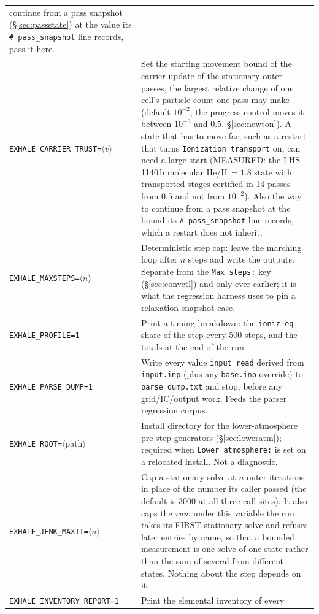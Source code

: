 \documentclass[english,a4paper]{my_memo}
\begin{document}
{\begin{longtable}{@{}lp{10.2cm}@{}}
  continue from a pass snapshot (\S\ref{sec:passstate}) at the value its
  \texttt{\# pass\_snapshot} line records, pass it here. \\
\texttt{EXHALE\_CARRIER\_TRUST=}$\langle v\rangle$ & Set the starting
  movement bound of the carrier update of the stationary outer passes, the
  largest relative change of one cell's particle count one pass may make
  (default $10^{-2}$; the progress control moves it between $10^{-3}$ and
  $0.5$, \S\ref{sec:newton}). A state that has to move far, such as a
  restart that turns \texttt{Ionization transport} on, can need a large start
  (MEASURED: the LHS\,1140\,b molecular He/H\,$=1.8$ state with transported
  stages certified in 14 passes from $0.5$ and not from $10^{-2}$). Also the
  way to continue from a pass snapshot at the bound its
  \texttt{\# pass\_snapshot} line records, which a restart does not inherit. \\
\midrule
\texttt{EXHALE\_MAXSTEPS=}$\langle n\rangle$ & Deterministic step cap: leave
  the marching loop after $n$ steps and write the outputs. Separate from the
  \texttt{Max steps:} key (\S\ref{sec:convctl}) and only ever earlier; it is
  what the regression harness uses to pin a relaxation-snapshot case. \\
\texttt{EXHALE\_PROFILE=1} & Print a timing breakdown: the
  \texttt{ioniz\_eq} share of the step every 500 steps, and the totals at the
  end of the run. \\
\texttt{EXHALE\_PARSE\_DUMP=1} & Write every value \texttt{input\_read}
  derived from \texttt{input.inp} (plus any \texttt{base.inp} override) to
  \texttt{parse\_dump.txt} and stop, before any grid/IC/output work. Feeds the
  parser regression corpus. \\
\texttt{EXHALE\_ROOT=}$\langle$path$\rangle$ & Install directory for the
  lower-atmosphere pre-step generators (\S\ref{sec:loweratm}); required when
  \texttt{Lower atmosphere:} is set on a relocated install. Not a diagnostic. \\
\midrule
\texttt{EXHALE\_JFNK\_MAXIT=}$\langle n\rangle$ & Cap a stationary solve at
  $n$ outer iterations in place of the number its caller passed (the default
  is $3000$ at all three call sites). It also caps the \emph{run}: under this
  variable the run takes its FIRST stationary solve and refuses later entries
  by name, so that a bounded measurement is one solve of one state rather
  than the sum of several from different states. Nothing about the step
  depends on it. \\
\texttt{EXHALE\_INVENTORY\_REPORT=1} & Print the elemental inventory of every

\end{longtable}}
\end{document}
